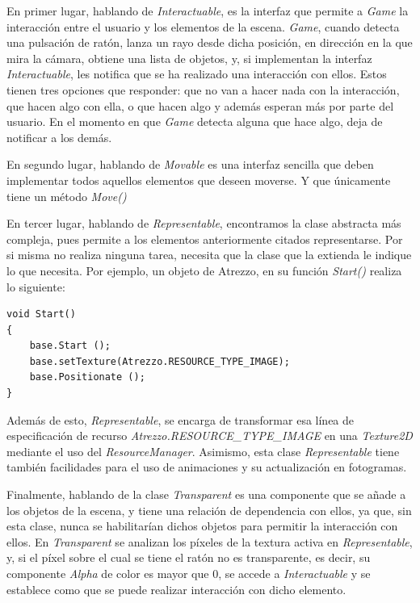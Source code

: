 En primer lugar, hablando de \textit{Interactuable}, es la interfaz que permite a \textit{Game} la interacción entre el usuario y los elementos de la escena. \textit{Game}, cuando detecta una pulsación de ratón, lanza un rayo desde dicha posición, en dirección en la que mira la cámara, obtiene una lista de objetos, y, si implementan la interfaz \textit{Interactuable}, les notifica que se ha realizado una interacción con ellos. Estos tienen tres opciones que responder: que no van a hacer nada con la interacción, que hacen algo con ella, o que hacen algo y además esperan más por parte del usuario. En el momento en que \textit{Game} detecta alguna que hace algo, deja de notificar a los demás.

En segundo lugar, hablando de \textit{Movable} es una interfaz sencilla que deben implementar todos aquellos elementos que deseen moverse. Y que únicamente tiene un método \textit{Move()}

En tercer lugar, hablando de \textit{Representable}, encontramos la clase abstracta más compleja, pues permite a los elementos anteriormente citados representarse. Por si misma no realiza ninguna tarea, necesita que la clase que la extienda le indique lo que necesita. Por ejemplo, un objeto de Atrezzo, en su función \textit{Start()} realiza lo siguiente:

\begin{lstlisting}
void Start()
{
	base.Start ();
	base.setTexture(Atrezzo.RESOURCE_TYPE_IMAGE);
	base.Positionate ();
}
\end{lstlisting}

Además de esto, \textit{Representable}, se encarga de transformar esa línea de especificación de recurso \textit{Atrezzo.RESOURCE\_TYPE\_IMAGE} en una \textit{Texture2D} mediante el uso del \textit{ResourceManager}. Asimismo, esta clase \textit{Representable} tiene también facilidades para el uso de animaciones y su actualización en fotogramas.

Finalmente, hablando de la clase \textit{Transparent} es una componente que se añade a los objetos de la escena, y tiene una relación de dependencia con ellos, ya que, sin esta clase, nunca se habilitarían dichos objetos para permitir la interacción con ellos. En \textit{Transparent} se analizan los píxeles de la textura activa en \textit{Representable}, y, si el píxel sobre el cual se tiene el ratón no es transparente, es decir, su componente \textit{Alpha} de color es mayor que 0, se accede a \textit{Interactuable} y se establece como que se puede realizar interacción con dicho elemento.

